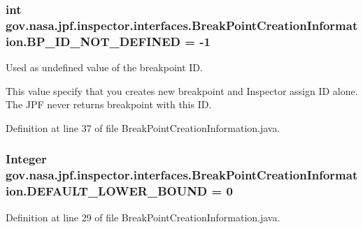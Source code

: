 \subsubsection[{\texorpdfstring{B\+P\+\_\+\+I\+D\+\_\+\+N\+O\+T\+\_\+\+D\+E\+F\+I\+N\+ED}{BP_ID_NOT_DEFINED}}]{\setlength{\rightskip}{0pt plus 5cm}int gov.\+nasa.\+jpf.\+inspector.\+interfaces.\+Break\+Point\+Creation\+Information.\+B\+P\+\_\+\+I\+D\+\_\+\+N\+O\+T\+\_\+\+D\+E\+F\+I\+N\+ED = -\/1}\hypertarget{interfacegov_1_1nasa_1_1jpf_1_1inspector_1_1interfaces_1_1_break_point_creation_information_a24626231e3744e59f505d0731d4ca9e1}{}\label{interfacegov_1_1nasa_1_1jpf_1_1inspector_1_1interfaces_1_1_break_point_creation_information_a24626231e3744e59f505d0731d4ca9e1}


Used as undefined value of the breakpoint ID. 

This value specify that you creates new breakpoint and Inspector assign ID alone. The J\+PF never returns breakpoint with this ID. 

Definition at line 37 of file Break\+Point\+Creation\+Information.\+java.

\subsubsection[{\texorpdfstring{D\+E\+F\+A\+U\+L\+T\+\_\+\+L\+O\+W\+E\+R\+\_\+\+B\+O\+U\+ND}{DEFAULT_LOWER_BOUND}}]{\setlength{\rightskip}{0pt plus 5cm}Integer gov.\+nasa.\+jpf.\+inspector.\+interfaces.\+Break\+Point\+Creation\+Information.\+D\+E\+F\+A\+U\+L\+T\+\_\+\+L\+O\+W\+E\+R\+\_\+\+B\+O\+U\+ND = 0}\hypertarget{interfacegov_1_1nasa_1_1jpf_1_1inspector_1_1interfaces_1_1_break_point_creation_information_a40131b93f82a84ed5322c4dc5ca4175e}{}\label{interfacegov_1_1nasa_1_1jpf_1_1inspector_1_1interfaces_1_1_break_point_creation_information_a40131b93f82a84ed5322c4dc5ca4175e}


Definition at line 29 of file Break\+Point\+Creation\+Information.\+java.

